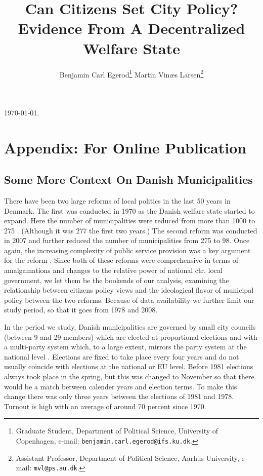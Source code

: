 \documentclass[a4paper,12pt]{article}
\title{\bigskip \bigskip \sffamily \LARGE{Can Citizens Set City Policy?} \\ \Large{ Evidence From A Decentralized Welfare State}}
\author{\bigskip Benjamin Carl Egerod\footnote[2]{Graduate Student, Department of Political Science, University of Copenhagen, e-mail: \texttt{benjamin.carl.egerod@ifs.ku.dk}.} \qquad Martin Vinæs Larsen\footnote[3]{Assistant Professor, Department of Political Science, Aarhus University, e-mail: \texttt{mvl@ps.au.dk}.}}
\begin{document}
	
	\begin{footnotesize} \noindent \today. \end{footnotesize} %
	
\onehalfspacing


\renewcommand{\thesubsection}{\Alph{subsection}}
\renewcommand{\thetable}{\Alph{subsection}\arabic{table}}
\renewcommand{\thefigure}{\Alph{subsection}\arabic{figure}}

\section*{Appendix: For Online Publication}

\localtableofcontents

\clearpage


\subsection{Some More Context On Danish Municipalities} \label{context}
There have been two large reforms of local politics in the last 50 years in Denmark. The first was conducted in 1970 as the Danish welfare state started to expand. Here the number of municipalities were reduced from more than 1000 to 275 \citep{ingvartsen1991kommunalreformen}. (Although it was 277 the first two years.)  The second reform was conducted in 2007 and further reduced the number of municipalities from 275 to 98. Once again, the increasing complexity of public service provision was a key argument for the reform \citep{christiansen2008utaenkelige}. Since both of these reforms were comprehensive in terms of amalgamations and changes to the relative power of national ctr. local government, we let them be the bookends of our analysis, examining the relationship between citizens policy views and the ideological flavor of municipal policy between the two reforms. Because of data availability we further limit our study period, so that it goes from 1978 and 2008.

In the period we study, Danish municipalities are governed by small city councils (between 9 and 29 members) which are elected at proportional elections and with a multi-party system which, to a large extent, mirrors the party system at the national level \citep{blom2013et}. Elections are fixed to take place every four years and do not usually coincide with elections at the national or EU level. Before 1981 elections always took place in the spring, but this was changed to November so that there would be a match between calender years and election terms. To make this change there was only three years between the elections of 1981 and 1978. Turnout is high with an average of around 70 percent since 1970.  
\end{document}
